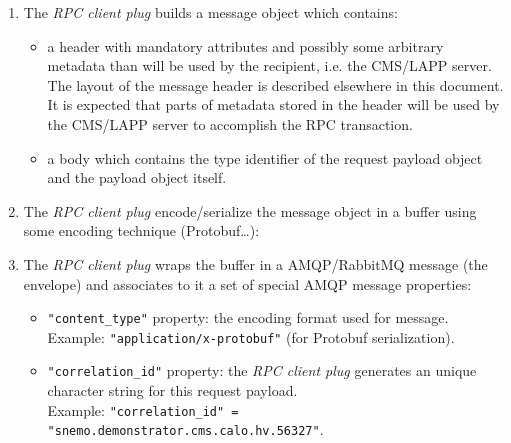 \begin{enumerate}
\item The \emph{RPC client plug} builds a message object which contains:

  \begin{itemize}

  \item a header with mandatory attributes and possibly some arbitrary
    metadata than will be used by the recipient, i.e. the CMS/LAPP
    server.   The layout  of  the message  header  is  described
    elsewhere  in this  document. It  is  expected that parts  of
    metadata stored in the header will  be used by the CMS/LAPP server
    to accomplish the RPC transaction.

  \item  a body  which contains  the  type identifier  of the  request
    payload object and the payload object itself.

  \end{itemize}
  \vskip 10pt
  \begin{center}
    \scalebox{0.7}{}
  \end{center}


\item The  \emph{RPC client plug} encode/serialize  the message object
  in a buffer using some encoding technique (Protobuf\dots):
  \vskip 10pt
  \begin{center}
    \scalebox{0.7}{}
  \end{center}

\item The \emph{RPC  client plug} wraps the buffer  in a AMQP/RabbitMQ
  message  (the   envelope)  and   associates to it a set of special   AMQP  message
  properties:

  \begin{itemize}

  \item    \texttt{"content\_type"}    property:   the encoding format used for message.\\
    Example:  \texttt{"application/x-protobuf"} (for    Protobuf
    serialization).

  \item \texttt{"correlation\_id"} property:  the \emph{RPC client plug}
    generates an unique character string for this request payload. \\
    Example:
    \texttt{"correlation\_id" = "snemo.demonstrator.cms.calo.hv.56327"}.


\end{itemize}
\end{enumerate}

